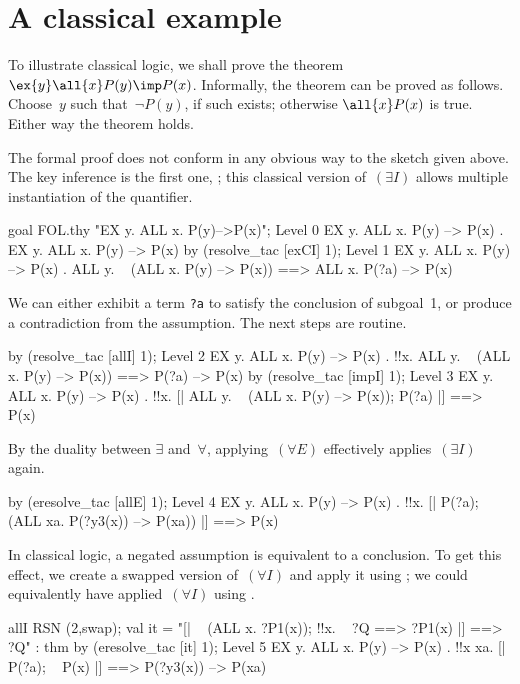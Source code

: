 \section{A classical example} \label{fol-cla-example}
To illustrate classical logic, we shall prove the theorem
$\ex{y}\all{x}P(y)\imp P(x)$.  Informally, the theorem can be proved as
follows.  Choose~$y$ such that~$\neg P(y)$, if such exists; otherwise
$\all{x}P(x)$ is true.  Either way the theorem holds.

The formal proof does not conform in any obvious way to the sketch given
above.  The key inference is the first one, ; this classical
version of~$(\exists I)$ allows multiple instantiation of the quantifier.
\begin{ttbox}
goal FOL.thy "EX y. ALL x. P(y)-->P(x)";
{\out Level 0}
{\out EX y. ALL x. P(y) --> P(x)}
{. EX y. ALL x. P(y) --> P(x)}
\ttbreak
by (resolve_tac [exCI] 1);
{\out Level 1}
{\out EX y. ALL x. P(y) --> P(x)}
{. ALL y. ~ (ALL x. P(y) --> P(x)) ==> ALL x. P(?a) --> P(x)}
\end{ttbox}
We can either exhibit a term {\tt?a} to satisfy the conclusion of
subgoal~1, or produce a contradiction from the assumption.  The next
steps are routine.
\begin{ttbox}
by (resolve_tac [allI] 1);
{\out Level 2}
{\out EX y. ALL x. P(y) --> P(x)}
{. !!x. ALL y. ~ (ALL x. P(y) --> P(x)) ==> P(?a) --> P(x)}
\ttbreak
by (resolve_tac [impI] 1);
{\out Level 3}
{\out EX y. ALL x. P(y) --> P(x)}
{. !!x. [| ALL y. ~ (ALL x. P(y) --> P(x)); P(?a) |] ==> P(x)}
\end{ttbox}
By the duality between $\exists$ and~$\forall$, applying~$(\forall E)$
effectively applies~$(\exists I)$ again.
\begin{ttbox}
by (eresolve_tac [allE] 1);
{\out Level 4}
{\out EX y. ALL x. P(y) --> P(x)}
{. !!x. [| P(?a); ~ (ALL xa. P(?y3(x)) --> P(xa)) |] ==> P(x)}
\end{ttbox}
In classical logic, a negated assumption is equivalent to a conclusion.  To
get this effect, we create a swapped version of~$(\forall I)$ and apply it
using ; we could equivalently have applied~$(\forall
I)$ using .
\begin{ttbox}
allI RSN (2,swap);
{\out val it = "[| ~ (ALL x. ?P1(x)); !!x. ~ ?Q ==> ?P1(x) |] ==> ?Q" : thm}
by (eresolve_tac [it] 1);
{\out Level 5}
{\out EX y. ALL x. P(y) --> P(x)}
{. !!x xa. [| P(?a); ~ P(x) |] ==> P(?y3(x)) --> P(xa)}
\end{ttbox}
